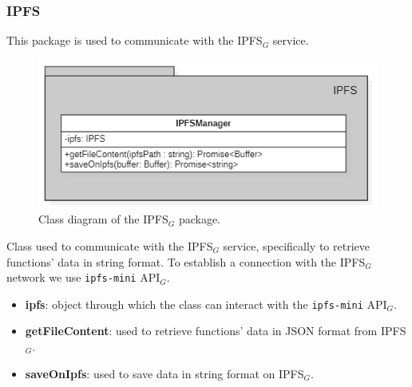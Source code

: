	\subsubsection{IPFS}
	This package is used to communicate with the IPFS$_{G}$ service.
	\begin{figure} [h!]
		\centering
		\includegraphics[width=0.8\linewidth]{diagrammi/etherless-server/IPFS}
		\caption{Class diagram of the IPFS$_{G}$ package.}
	\end{figure}
	Class used to communicate with the IPFS$_{G}$ service, specifically to retrieve functions' data in string format. To establish a connection with the IPFS$_{G}$ network we use \texttt{ipfs-mini} API$_{G}$. 
	\begin{itemize}
		\item \textbf{ipfs}: object through which the class can interact with the \texttt{ipfs-mini} API$_{G}$.
	\end{itemize}
	\begin{itemize}
		\item \textbf{getFileContent}: used to retrieve functions' data in JSON format from IPFS$_{G}$.
		\item \textbf{saveOnIpfs}: used to save data in string format on IPFS$_{G}$.
	\end{itemize}
